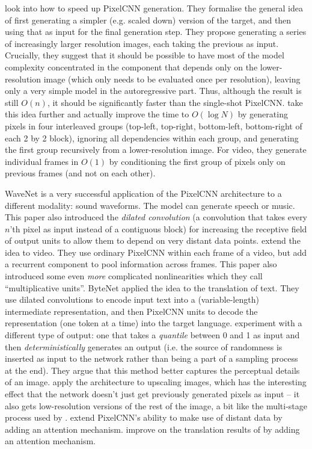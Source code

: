 \documentclass[10pt,a4paper]{article}
\newcommand{\nquote}[1]{``{#1}''}
\begin{document}
\citet{auxiliary} look into how to speed up PixelCNN generation. They formalise the general idea of first generating a simpler (e.g. scaled down) version of the target, and then using that as input for the final generation step. They propose generating a series of increasingly larger resolution images, each taking the previous as input. Crucially, they suggest that it should be possible to have most of the model complexity concentrated in the component that depends only on the lower-resolution image (which only needs to be evaluated once per resolution), leaving only a very simple model in the autoregressive part. Thus, although the result is still $O(n)$, it should be significantly faster than the single-shot PixelCNN. \citet{multiscale} take this idea further and actually improve the time to $O(\log N)$ by generating pixels in four interleaved groups (top-left, top-right, bottom-left, bottom-right of each 2 by 2 block), ignoring all dependencies within each group, and generating the first group recursively from a lower-resolution image. For video, they generate individual frames in $O(1)$ by conditioning the first group of pixels only on previous frames (and not on each other).

WaveNet \citep{wavenet} is a very successful application of the PixelCNN architecture to a different modality: sound waveforms. The model can generate speech or music. This paper also introduced the \emph{dilated convolution} (a convolution that takes every $n$'th pixel as input instead of a contiguous block) for increasing the receptive field of output units to allow them to depend on very distant data points. \citet{videopixel} extend the idea to video. They use ordinary PixelCNN within each frame of a video, but add a recurrent component to pool information across frames. This paper also introduced some even \emph{more} complicated nonlinearities which they call \nquote{multiplicative units}. ByteNet \citet{bytenet} applied the idea to the translation of text. They use dilated convolutions to encode input text into a (variable-length) intermediate representation, and then PixelCNN units to decode the representation (one token at a time) into the target language. \citet{quantile} experiment with a different type of output: one that takes a \emph{quantile} between 0 and 1 as input and then \emph{deterministically} generates an output (i.e. the source of randomness is inserted as input to the network rather than being a part of a sampling process at the end). They argue that this method better captures the perceptual details of an image. \citet{superres} apply the architecture to upscaling images, which has the interesting effect that the network doesn't just get previously generated pixels as input -- it also gets low-resolution versions of the rest of the image, a bit like the multi-stage process used by \citet{pixelcnn1}. \citet{pixelsnail} extend PixelCNN's ability to make use of distant data by adding an attention mechanism. \citet{fbtranslate} improve on the translation results of \citet{bytenet} by adding an attention mechanism.
\end{document}
